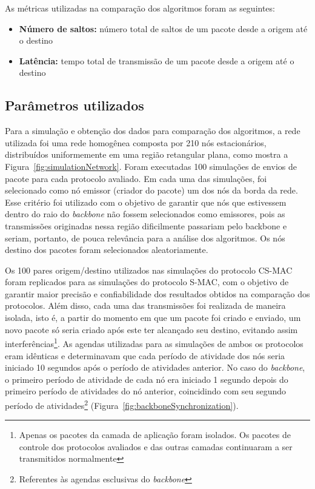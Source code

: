 As métricas utilizadas na comparação dos algoritmos foram as seguintes:

\begin{itemize}
\item \textbf{Número de saltos:} número total de saltos de um pacote desde a origem até o destino
\item \textbf{Latência:} tempo total de transmissão de um pacote desde a origem até o destino
\end{itemize} 

\subsection{Parâmetros utilizados}

Para a simulação e obtenção dos dados para comparação dos algoritmos, a rede utilizada foi uma rede homogênea composta por 210 nós estacionários, distribuídos uniformemente em uma região retangular plana, como mostra a Figura~\ref{fig:simulationNetwork}. Foram executadas 100 simulações de envios de pacote para cada protocolo avaliado. Em cada uma das simulações, foi selecionado como nó emissor (criador do pacote) um dos nós da borda da rede. Esse critério foi utilizado com o objetivo de garantir que nós que estivessem dentro do raio do \emph{backbone} não fossem selecionados como emissores, pois as transmissões originadas nessa região dificilmente passariam pelo backbone e seriam, portanto, de pouca relevância para a análise dos algoritmos. Os nós destino dos pacotes foram selecionados aleatoriamente.

Os 100 pares origem/destino utilizados nas simulações do protocolo CS-MAC foram replicados para as simulações do protocolo S-MAC, com o objetivo de garantir maior precisão e confiabilidade dos resultados obtidos na comparação dos protocolos. Além disso, cada uma das transmissões foi realizada de maneira isolada, isto é, a partir do momento em que um pacote foi criado e enviado, um novo pacote só seria criado após este ter alcançado seu destino, evitando assim interferências\footnote{Apenas os pacotes da camada de aplicação foram isolados. Os pacotes de controle dos protocolos avaliados e das outras camadas continuaram a ser transmitidos normalmente}. As agendas utilizadas para as simulações de ambos os protocolos eram idênticas e determinavam que cada período de atividade dos nós seria iniciado 10 segundos após o período de atividades anterior. No caso do \emph{backbone}, o primeiro período de atividade de cada nó era iniciado 1 segundo depois do primeiro período de atividades do nó anterior, coincidindo com seu segundo período de atividades\footnote{Referentes às agendas esclusivas do \emph{backbone}} (Figura~\ref{fig:backboneSynchronization}).   

